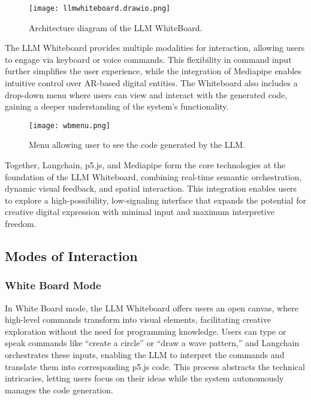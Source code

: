 \begin{figure}[h!]
    \centering
    \texttt{[image: llmwhiteboard.drawio.png]}
    \caption{Architecture diagram of the LLM WhiteBoard.}
    \vspace{0.1cm}
    \label{fig:wbarchietcure}
\end{figure}

The LLM Whiteboard provides multiple modalities for interaction, allowing users to engage via keyboard or voice commands.
This flexibility in command input further simplifies the user experience, while the integration of Mediapipe enables intuitive control over AR-based digital entities.
The Whiteboard also includes a drop-down menu where users can view and interact with the generated code, gaining a deeper understanding of the system’s functionality.

\begin{figure}[h!]
    \centering
    \texttt{[image: wbmenu.png]}
    \caption{Menu allowing user to see the code generated by the LLM.}
    \vspace{0.1cm}
    \label{fig:wbmenu}
\end{figure}

Together, Langchain, p5.js, and Mediapipe form the core technologies at the foundation of the LLM Whiteboard, combining real-time semantic orchestration, dynamic visual feedback, and spatial interaction.
This integration enables users to explore a high-possibility, low-signaling interface that expands the potential for creative digital expression with minimal input and maximum interpretive freedom.


\subsection{Modes of Interaction}

\subsubsection{White Board Mode}

In White Board mode, the LLM Whiteboard offers users an open canvas, where high-level commands transform into visual elements, facilitating creative exploration without the need for programming knowledge.
Users can type or speak commands like “create a circle” or “draw a wave pattern,” and Langchain orchestrates these inputs, enabling the LLM to interpret the commands and translate them into corresponding p5.js code.
This process abstracts the technical intricacies, letting users focus on their ideas while the system autonomously manages the code generation.

